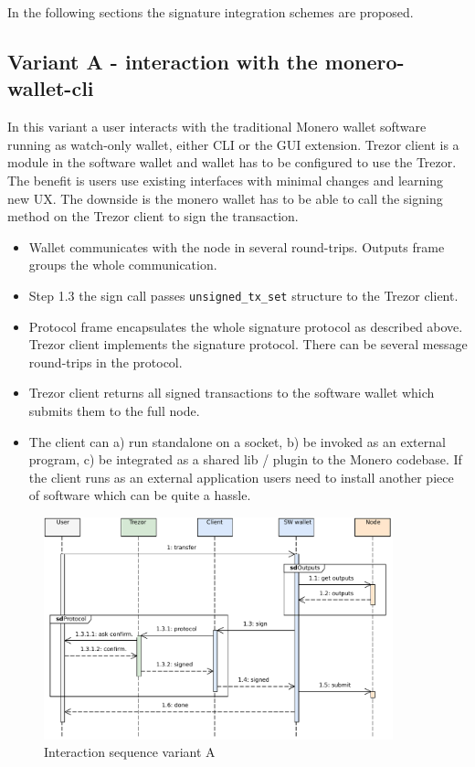 \documentclass[]{article}
\begin{document}
In the following sections the signature integration schemes are proposed.

\subsection{Variant A - interaction with the monero-wallet-cli}
In this variant a user interacts with the traditional Monero wallet software running as watch-only wallet, either CLI or the GUI extension. Trezor client is a module in the software wallet and wallet has to be configured to use the Trezor. 
The benefit is users use existing interfaces with minimal changes and learning new UX.
The downside is the monero wallet has to be able to call the signing method on the Trezor client to sign the transaction.

\begin{itemize}
	\item Wallet communicates with the node in several round-trips. Outputs frame groups the whole communication.
	\item Step 1.3 the sign call passes \verb|unsigned_tx_set| structure to the Trezor client. 
	\item Protocol frame encapsulates the whole signature protocol as described above. Trezor client implements the signature protocol. There can be several message round-trips in the protocol.
	\item Trezor client returns all signed transactions to the software wallet which submits them to the full node.
	\item The client can a) run standalone on a socket, b) be invoked as an external program, c) be integrated as a shared lib / plugin to the Monero codebase. If the client runs as an external application users need to install another piece of software which can be quite a hassle.
\end{itemize}
 
\begin{figure}[H]
	\centering
	\includegraphics[width=0.9\textwidth, angle=0]{variantA.pdf}
	\caption{Interaction sequence variant A}
\end{figure}
\end{document}
